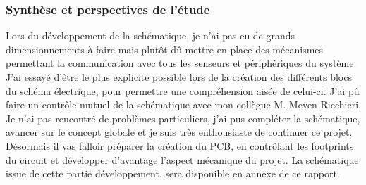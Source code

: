 {	\clearpage
	\subsubsection{Synthèse et perspectives de l'étude} \label{sssec:conclusionEtude}
	{
		Lors du développement de la schématique, je n'ai pas eu de grands dimensionnements à faire mais plutôt dû mettre en place des mécanismes permettant la communication avec tous les senseurs et périphériques du système. J'ai essayé d'être le plus explicite possible lors de la création des différents blocs du schéma électrique, pour permettre une compréhension aisée de celui-ci. 
		J'ai pû faire un contrôle mutuel de la schématique avec mon collègue M. Meven Ricchieri.
		Je n'ai pas rencontré de problèmes particuliers, j'ai pus compléter la schématique, avancer sur le concept globale et je suis très enthousiaste de continuer ce projet.
		Désormais il vas falloir préparer la création du PCB, en contrôlant les footprints du circuit et développer d'avantage l'aspect mécanique du projet.
		La schématique issue de cette partie développement,  sera disponible en annexe de ce rapport.
		
		
	}
	

}


\clearpage